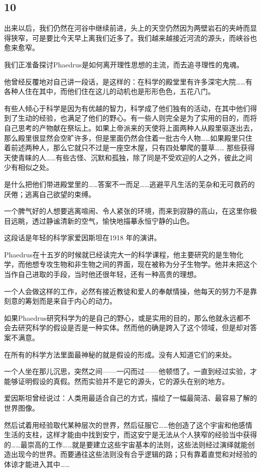 \documentclass[UTF8]{article}
\begin{document}
\subsection*{10}
\par 出来以后，我们仍然在河谷中继续前进，头上的天空仍然因为两壁岩石的夹峙而显得狭窄，可是要比今天早上离我们近多了。我们越来越接近河流的源头，而峡谷也愈来愈窄。
\par 我们正准备探讨Phaedrus是如何离开理性思想的主流，而去追寻理性的鬼魂。
\par 他曾经反覆地对自己讲一段话，是这样的：在科学的殿堂里有许多深宅大院……有各种人住在其中，而他们住在这儿的动机也是形形色色，五花八门。
\par 有些人倾心于科学是因为有优越的智力，科学成了他们独有的活动，在其中他们得到了生动的经验，也满足了他们的野心。有一些人则完全是为了实用的目的，而将自己思考的产物献在祭坛上。如果上帝派来的天使将上面两种人从殿里驱逐出去，那么殿里很显然会空旷许多，但是里面仍然会住着一批古今人物……如果殿里只住着前述两种人，那么它就只不过是一座空木屋，只有四处攀爬的蔓草…… 那些获得天使青睐的人……有些古怪、沉默和孤独，除了同是不受欢迎的人之外，彼此之间少有相似之处。
\par 是什么把他们带进殿堂里的……答案不一而足……逃避平凡生活的芜杂和无可救药的厌倦；逃离自己欲望的束缚。
\par 一个脾气好的人想要逃离喧闹、令人紧张的环境，而来到寂静的高山，在这里你极目远眺，透过静谧清新的空气，愉快地描摹永恒宁静的山色。
\par 这段话是年轻的科学家爱因斯坦在1918 年的演讲。
\par Phaedrus在十五岁的时候就已经读完大一的科学课程，他主要研究的是生物化学，而他想专攻生物和非生物之间的界面，现在被称为分子生物学。他并未把这个当作自己进取的手段，当时他还很年轻，还有一种高贵的理想。
\par 一个人会做这样的工作，必然有接近教徒和爱人的奉献情操，他每天的努力不是靠刻意的筹划而是来自于内心的动力。
\par 如果Phaedrus研究科学为的是自己的野心，或是实用的目的，那么他就永远都不会去研究科学的假设是否是一种实体。然而他的确是跨入了这个领域，但是却对答案不满意。
\par 在所有的科学方法里面最神秘的就是假设的形成。没有人知道它们的来处。
\par 一个人坐在那儿沉思，突然之间——一闪而过——他顿悟了。一直到经过实验，才能够证明假设的真假。然而实验并不是它的源头，它的源头在别的地方。
\par 爱因斯坦曾经说过：人类用最适合自己的方式，描绘了一幅最简洁、最容易了解的世界图像。
\par 然后试着用经验取代某种层次的世界，然后征服它……他创造了这个宇宙和他感情生活的支柱，这样才能由中找到安宁，而这安宁是无法从个人狭窄的经验当中获得的……最崇高的工作……就是要建立这些宇宙基本的法则，这些法则经过演绎就能创造出现今的世界。而要通往这些法则没有合乎逻辑的路；只有靠着直觉和对经验的体谅才能进入其中……
\end{document}
